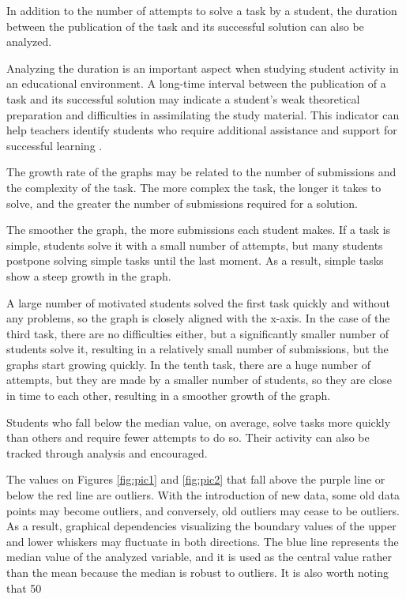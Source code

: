 \documentclass{article}
\begin{document}
\begin{multicols}{2}
\begin{justify}
      In addition to the number of attempts to solve a task by a student, the duration between the publication of the task and its successful solution can also be analyzed.

      Analyzing the duration is an important aspect when studying student activity in an educational environment. A long-time interval between the publication of a task and its successful solution may indicate a student's weak theoretical preparation and difficulties in assimilating the study material. This indicator can help teachers identify students who require additional assistance and support for successful learning \cite{16}.

      The growth rate of the graphs may be related to the number of submissions and the complexity of the task. The more complex the task, the longer it takes to solve, and the greater the number of submissions required for a solution.

      The smoother the graph, the more submissions each student makes. If a task is simple, students solve it with a small number of attempts, but many students postpone solving simple tasks until the last moment. As a result, simple tasks show a steep growth in the graph.

      A large number of motivated students solved the first task quickly and without any problems, so the graph is closely aligned with the x-axis. In the case of the third task, there are no difficulties either, but a significantly smaller number of students solve it, resulting in a relatively small number of submissions, but the graphs start growing quickly. In the tenth task, there are a huge number of attempts, but they are made by a smaller number of students, so they are close in time to each other, resulting in a smoother growth of the graph.

      Students who fall below the median value, on average, solve tasks more quickly than others and require fewer attempts to do so. Their activity can also be tracked through analysis and encouraged.

      The values on Figures \ref{fig:pic1} and \ref{fig:pic2} that fall above the purple line or below the red line are outliers. With the introduction of new data, some old data points may become outliers, and conversely, old outliers may cease to be outliers. As a result, graphical dependencies visualizing the boundary values of the upper and lower whiskers may fluctuate in both directions. The blue line represents the median value of the analyzed variable, and it is used as the central value rather than the mean because the median is robust to outliers. It is also worth noting that 50%


\end{justify}
\end{multicols}
\end{document}
